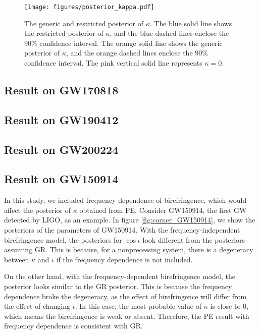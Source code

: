 \documentclass[aps,prd,twocolumn,superscriptaddress,preprintnumbers,floatfix,nofootinbib]{revtex4-2}
\begin{document}
\begin{figure}
    \texttt{[image: figures/posterior\_kappa.pdf]}
    \caption{
        The generic and restricted posterior of $\kappa$.
        The blue solid line shows the restricted posterior of $\kappa$, and the blue dashed lines enclose the $90\%$ confidence interval.
        The orange solid line shows the generic posterior of $\kappa$, and the orange dashed lines enclose the $90\%$ confidence interval.
        The pink vertical solid line represents $\kappa=0$.
    }
    \label{fig:posterior_kappa}
\end{figure}



\subsection{Result on GW170818}

\subsection{Result on GW190412}

\subsection{Result on GW200224}

\subsection{Result on GW150914}
In this study, we included frequency dependence of birefringence, which would affect the posterior of $\kappa$ obtained from PE.
Consider GW150914, the first GW detected by LIGO, as an example.
In figure \ref{fig:corner_GW150914}, we show the posteriors of the parameters of GW150914.
With the frequency-independent birefringence model, the posteriors for $\cos\iota$ look different from the posteriors assuming GR.
This is because, for a nonprecessing system, there is a degeneracy between $\kappa$ and $\iota$ if the frequency dependence is not included.

On the other hand, with the frequency-dependent birefringence model, the posterior looks similar to the GR posterior.
This is because the frequency dependence broke the degeneracy, as the effect of birefringence will differ from the effect of changing $\iota$.
In this case, the most probable value of $\kappa$ is close to $0$, which means the birefringence is weak or absent.
Therefore, the PE result with frequency dependence is consistent with GR.
\end{document}

